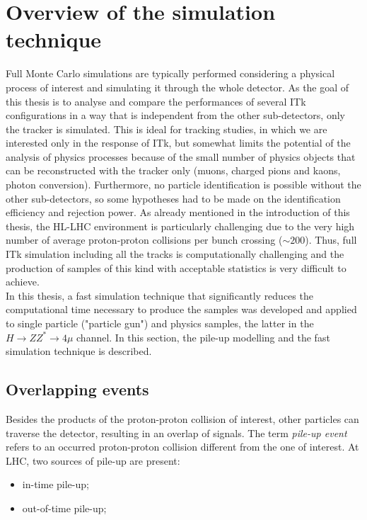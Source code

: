 \documentclass[a4paper,twoside,12pt]{article}
\begin{document}
\clearpage

\section{Overview of the simulation technique}\label{sec:simulation}
Full Monte Carlo simulations are typically performed considering 
a physical process of interest and simulating it through the whole detector. As the goal of this
thesis is to analyse and compare the performances of several ITk configurations in a way that
is independent from the other sub-detectors, only the tracker is simulated. This is 
ideal for tracking studies, in which we are interested only in the response of ITk, but
somewhat 
limits the potential of the analysis of physics processes because of the small number of physics objects that can be reconstructed with the tracker only (muons, charged pions and kaons, photon conversion). Furthermore, no particle identification is possible without the other sub-detectors, so some
 hypotheses had to be made on the identification efficiency and rejection power.
As already mentioned in the introduction of this thesis, the HL-LHC environment is particularly
challenging due to the very high number of average proton-proton collisions per bunch crossing ($\sim 200$). Thus, full ITk simulation including all the tracks is computationally challenging 
and the production of samples of this kind with acceptable statistics is very difficult
to achieve.\\

In this thesis, a fast simulation technique that
significantly reduces the computational time necessary to produce the samples was developed and applied to single particle ("particle gun") and physics samples, the latter 
in the $H \rightarrow ZZ^{*} \rightarrow 4\mu$ channel. In this section,
the pile-up modelling and the fast simulation technique is described.

\subsection{Overlapping events}
Besides the products of the proton-proton collision of interest, other particles can traverse the detector, resulting in an overlap of signals. The term \textit{pile-up event} refers to an occurred proton-proton collision different from the one of interest. At LHC, two sources of pile-up are present:

\begin{itemize}
\item in-time pile-up;
\item out-of-time pile-up;
\end{itemize}
\end{document}
